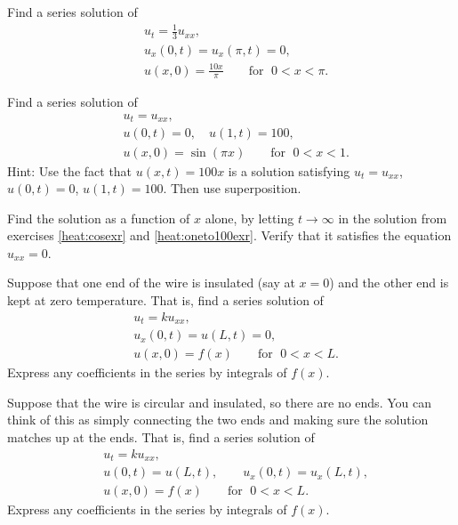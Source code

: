 \begin{exercise} \label{heat:cosexr}
Find a series solution of
\begin{align*}
& u_t = \frac{1}{3} u_{xx} , \\
& u_x(0,t) = u_x(\pi,t) = 0 , \\
& u(x,0) = \frac{10x}{\pi} \qquad \text{for } \; 0 < x < \pi .
\end{align*}
\end{exercise}

\begin{exercise} \label{heat:oneto100exr}
Find a series solution of
\begin{align*}
& u_t =  u_{xx} , \\
& u(0,t) = 0 , \quad u(1,t) = 100 , \\
& u(x,0) = \sin (\pi x) \qquad \text{for } \; 0 < x < 1 .
\end{align*}
Hint: Use the fact that $u(x,t) = 100 x$ is a solution satisfying
$u_t = u_{xx}$, $u(0,t) = 0$, $u(1,t) = 100$.  Then use superposition.
\end{exercise}

\begin{exercise}
Find the \emph{} solution as a function
of $x$ alone,
by letting $t \to
\infty$ in the solution from
exercises \ref{heat:cosexr} and \ref{heat:oneto100exr}.
Verify that it satisfies the equation $u_{xx} = 0$.
\end{exercise}

\begin{exercise}[challenging]
Suppose that one end of the wire is insulated (say at $x=0$) and
the other end is kept at zero temperature.  That is,
find a series solution of
\begin{align*}
& u_t = k u_{xx} , \\
& u_x(0,t) = u(L,t) = 0 , \\
& u(x,0) = f(x) \qquad \text{for } \; 0 < x < L .
\end{align*}
Express any coefficients in the series by integrals of $f(x)$.
\end{exercise}

\begin{exercise}[challenging]
Suppose that the wire is circular and insulated, so there are no ends. 
You can think of this as simply connecting the two ends and 
making sure the solution matches up at the ends.
That is, find a series solution of
\begin{align*}
& u_t = k u_{xx} , \\
& u(0,t) = u(L,t) , \qquad
u_x(0,t) = u_x(L,t) , \\
& u(x,0) = f(x) \qquad \text{for } \; 0 < x < L .
\end{align*}
Express any coefficients in the series by integrals of $f(x)$.
\end{exercise}

